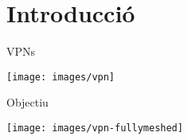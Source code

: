 \section{Introducció}
    \begin{frame}{VPNs}
        \begin{center}
        \texttt{[image: images/vpn]}
        \end{center}
    \end{frame}
    \begin{frame}{Objectiu}
        \begin{center}
        \texttt{[image: images/vpn-fullymeshed]}
        \end{center}
    \end{frame}
